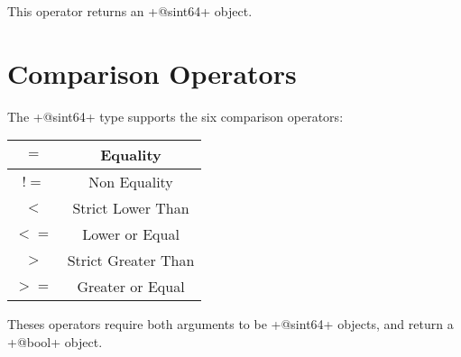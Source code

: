 This operator returns an \ggs+@sint64+ object.







\section{Comparison Operators}

The \ggs+@sint64+ type supports the six comparison operators:\newline

\begin{tabular}{|c|c|}
\hline
$=$ & Equality \\
\hline
$!=$ & Non Equality \\
\hline
$<$  & Strict Lower Than \\
\hline
$<=$  & Lower or Equal \\
\hline
$>$  & Strict Greater Than \\
\hline
$>=$  & Greater or Equal \\
\hline
\end{tabular}

Theses operators require both arguments to be \ggs+@sint64+ objects, and return a \ggs+@bool+ object.


